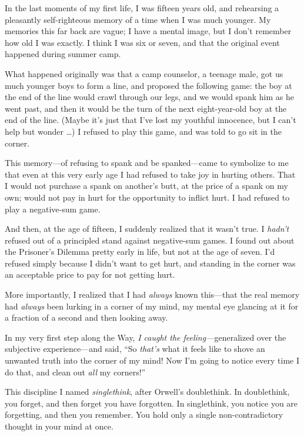 {
 In the last moments of my first life, I was fifteen years old, and
rehearsing a pleasantly self-righteous memory of a time when I was much
younger. My memories this far back are vague; I have a mental image,
but I don't remember how old I was exactly. I think I
was six or seven, and that the original event happened during summer
camp.}

{
 What happened originally was that a camp counselor, a teenage
male, got us much younger boys to form a line, and proposed the
following game: the boy at the end of the line would crawl through our
legs, and we would spank him as he went past, and then it would be the
turn of the next eight-year-old boy at the end of the line. (Maybe
it's just that I've lost my youthful
innocence, but I can't help but wonder \ldots) I refused
to play this game, and was told to go sit in the corner.}

{
 This memory---of refusing to spank and be spanked---came to
symbolize to me that even at this very early age I had refused to take
joy in hurting others. That I would not purchase a spank on
another's butt, at the price of a spank on my own;
would not pay in hurt for the opportunity to inflict hurt. I had
refused to play a negative-sum game.}

{
 And then, at the age of fifteen, I suddenly realized that it
wasn't true. I \textit{hadn't} refused
out of a principled stand against negative-sum games. I found out about
the Prisoner's Dilemma pretty early in life, but not at
the age of seven. I'd refused simply because I
didn't want to get hurt, and standing in the corner was
an acceptable price to pay for not getting hurt.}

{
 More importantly, I realized that I had \textit{always} known
this---that the real memory had \textit{always} been lurking in a
corner of my mind, my mental eye glancing at it for a fraction of a
second and then looking away.}

{
 In my very first step along the Way, \textit{I caught the
feeling---}generalized over the subjective experience---and said,
``So \textit{that's} what it feels
like to shove an unwanted truth into the corner of my mind! Now
I'm going to notice every time I do that, and clean out
\textit{all} my corners!''}

{
 This discipline I named \textit{singlethink}, after
Orwell's doublethink. In doublethink, you forget, and
then forget you have forgotten. In singlethink, you notice you are
forgetting, and then you remember. You hold only a single
non-contradictory thought in your mind at once.}

